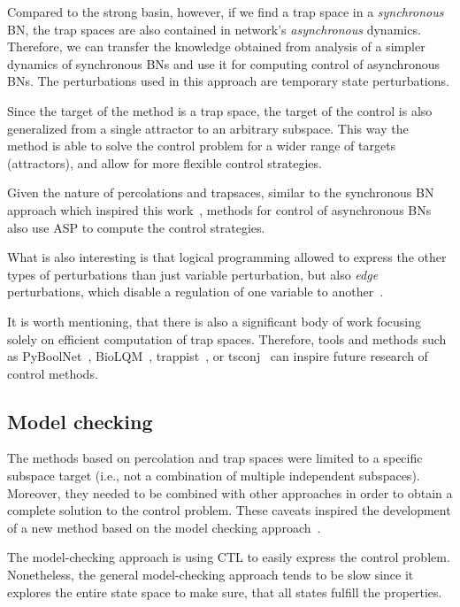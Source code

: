 Compared to the strong basin, however, if we find a trap space in a \emph{synchronous} BN, the trap spaces are also contained in network's \emph{asynchronous} dynamics. Therefore, we can transfer the knowledge obtained from analysis of a simpler dynamics of synchronous BNs and use it for computing control of asynchronous BNs. The perturbations used in this approach are temporary state perturbations. 

Since the target of the method is a trap space, the target of the control is also generalized from a single attractor to an arbitrary subspace. This way the method is able to solve the control problem for a wider range of targets (attractors), and allow for more flexible control strategies. 

Given the nature of percolations and trapsaces, similar to the synchronous BN approach which inspired this work~\cite{Krumsiek2011}, methods for control of asynchronous BNs also use ASP to compute the control strategies. 

What is also interesting is that logical programming allowed to express the other types of perturbations than just variable perturbation, but also \emph{edge} perturbations, which disable a regulation of one variable to another~\cite{Fontanals2022c,Fontanals2023}.

It is worth mentioning, that there is also a significant body of work focusing solely on efficient computation of trap spaces. Therefore, tools and methods such as PyBoolNet~\cite{Klarner2018}, BioLQM~\cite{Naldi2018}, trappist~\cite{Trinh2022}, or tsconj~\cite{Trinh2024} can inspire future research of control methods.

\subsection{Model checking}
\label{ss:model_checking}

The methods based on percolation and trap spaces were limited to a specific subspace target (i.e., not a combination of multiple independent subspaces). Moreover, they needed to be combined with other approaches in order to obtain a complete solution to the control problem. These caveats inspired the development of a new method based on the model checking approach~\cite{Fontanals2022b}. 

The model-checking approach is using CTL to easily express the control problem. Nonetheless, the general model-checking approach tends to be slow since it explores the entire state space to make sure, that all states fulfill the properties.

